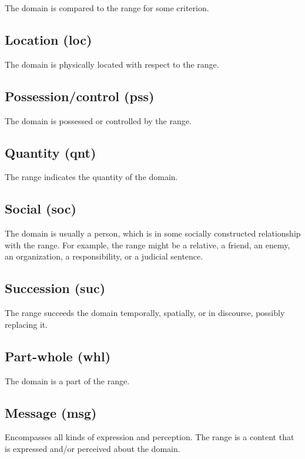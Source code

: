 \documentclass[a4paper]{article}
\begin{document}
The domain is compared to the range for some criterion.

\subsection{Location (loc)}

The domain is physically located with respect to the range.

\subsection{Possession/control (pss)}

The domain is possessed or controlled by the range.

\subsection{Quantity (qnt)}

The range indicates the quantity of the domain.



\subsection{Social (soc)}

The domain is usually a person, which is in some socially constructed relationship with the range. For example, the range might be a relative, a friend, an enemy, an organization, a responsibility, or a judicial sentence.

\subsection{Succession (suc)}

The range succeeds the domain temporally, spatially, or in discourse, possibly replacing it.

\subsection{Part-whole (whl)}

The domain is a part of the range.

\subsection{Message (msg)}

Encompasses all kinds of expression and perception. The range is a content that is expressed and/or perceived about the domain.
\end{document}
